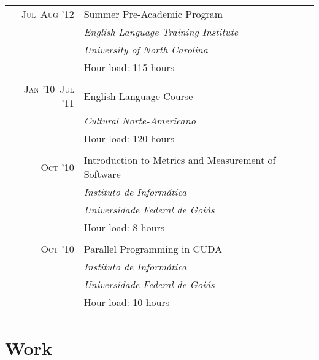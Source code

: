 \documentclass[a4paper,10pt]{article}
\begin{document}
\begin{tabular}{r|p{11cm}}
  \textsc{Jul--Aug '12} & Summer Pre-Academic Program\\ &
  \emph{English Language Training Institute}\\ &
  \emph{University of North Carolina}\\ &
  Hour load: 115 hours
  \\\multicolumn{2}{c}{} \\

  \textsc{Jan '10--Jul '11} & English Language Course\\ &
  \emph{Cultural Norte-Americano} \\ &
  Hour load: 120 hours
  \\\multicolumn{2}{c}{} \\

  \textsc{Oct '10} & Introduction to Metrics and Measurement of Software\\ &
  \emph{Instituto de Informática} \\ &
  \emph{Universidade Federal de Goiás}\\ &
  Hour load: 8 hours
  \\\multicolumn{2}{c}{} \\

  \textsc{Oct '10} & Parallel Programming in CUDA\\ &
  \emph{Instituto de Informática} \\ &
  \emph{Universidade Federal de Goiás}\\ &
  Hour load: 10 hours
\end{tabular}

\section{Work}
\end{document}
